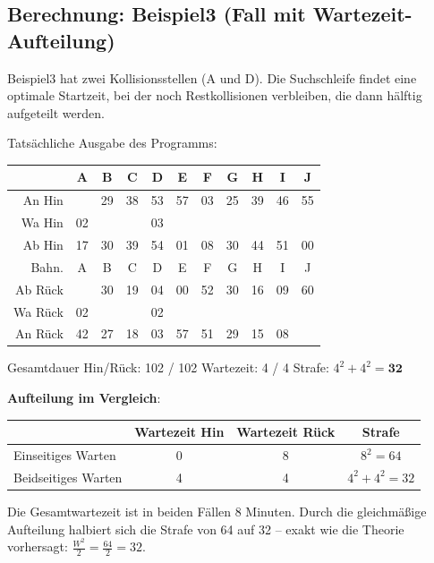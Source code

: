 \documentclass[12pt,a4paper]{article}
\begin{document}
\subsection{Berechnung: Beispiel3 (Fall mit Wartezeit-Aufteilung)}

\begin{beispielbox}[title={Beidseitiges Warten -- Beispiel3: A--B--C--D--E--F--G--H--I--J, Start: 17}]

Beispiel3 hat zwei Kollisionsstellen (A und D). Die Suchschleife findet eine optimale Startzeit, bei der noch Restkollisionen verbleiben, die dann hälftig aufgeteilt werden.

Tatsächliche Ausgabe des Programms:
\begin{center}
\begin{tabular}{r|cccccccccc}
 & A & B & C & D & E & F & G & H & I & J \\
\hline
An Hin  &   & 29 & 38 & 53 & 57 & 03 & 25 & 39 & 46 & 55 \\
Wa Hin  & 02 &    &    & 03 &    &    &    &    &    &   \\
Ab Hin  & 17 & 30 & 39 & 54 & 01 & 08 & 30 & 44 & 51 & 00 \\
\hline
Bahn.   & A  & B  & C  & D  & E  & F  & G  & H  & I  & J \\
\hline
Ab Rück &    & 30 & 19 & 04 & 00 & 52 & 30 & 16 & 09 & 60 \\
Wa Rück & 02 &    &    & 02 &    &    &    &    &    &   \\
An Rück & 42 & 27 & 18 & 03 & 57 & 51 & 29 & 15 & 08 &   \\
\end{tabular}
\end{center}

Gesamtdauer Hin/Rück: 102 / 102 \quad Wartezeit: 4 / 4 \quad Strafe: $4^2 + 4^2 = \mathbf{32}$

\textbf{Aufteilung im Vergleich}:

\begin{center}
\begin{tabular}{lccc}
\toprule
 & \textbf{Wartezeit Hin} & \textbf{Wartezeit Rück} & \textbf{Strafe} \\
\midrule
Einseitiges Warten & 0 & 8 & $8^2 = 64$ \\
Beidseitiges Warten & 4 & 4 & $4^2 + 4^2 = 32$ \\
\bottomrule
\end{tabular}
\end{center}

Die Gesamtwartezeit ist in beiden Fällen 8 Minuten. Durch die gleichmäßige Aufteilung halbiert sich die Strafe von 64 auf 32 -- exakt wie die Theorie vorhersagt: $\frac{W^2}{2} = \frac{64}{2} = 32$.
\end{beispielbox}
\end{document}
